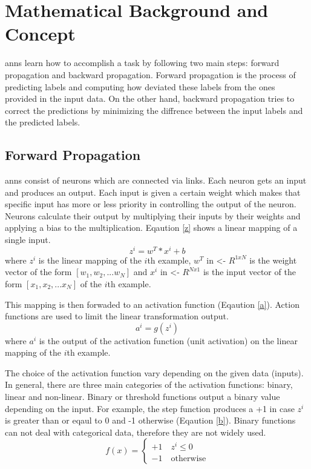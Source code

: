\documentclass[runningheads]{llncs}
\begin{document}
\section{Mathematical Background and Concept}
\gls{anns} learn how to accomplish a task by following two main steps:
forward propagation and backward propagation. Forward propagation is the process of
predicting labels and computing how deviated these labels from the ones provided in the input data.
On the other hand, backward propagation tries to correct the predictions by minimizing
the diffrence between the input labels and the predicted labels. 
\subsection{Forward Propagation}
\gls{anns} consist of neurons which are connected via links. Each neuron gets an input and produces an output. 
Each input is given a certain weight which makes that specific input has more or less priority in controlling the output of the neuron.
Neurons calculate their output by multiplying their inputs by their weights and applying a bias to the multiplication. Eqaution \ref{z}
shows a linear mapping of a single input.
\begin{equation}
\label{z}
    z^i = w^T * x^i + b
\end{equation}
where $z^i$ is the linear mapping of the $i$th example,  $w^T$ in <- $ R^{1xN} $ is the weight vector of the form $[w_1, w_2, ... w_N]$ and
$x^i$ in <- $ R^{Nx1} $ is the input vector  of the form $[x_1, x_2, ... x_N]$ of the $i$th example.

This mapping is then forwaded to an activation function (Eqaution \ref{a}).
Action functions are used to limit the linear transformation output.
\begin{equation}
    \label{a}
        a^i = g(z^i)
\end{equation}
where $a^i$ is the output of the activation function (unit activation) on the linear mapping of the $i$th example.

The choice of the activation function vary depending on the given data (inputs). 
In general, 
there are three main categories of the activation functions: binary, linear and non-linear. 
Binary or threshold functions output a binary value depending on the input. 
For example, the step function produces a +1 in case $z^i$ is greater than or eqaul to 0 and -1 otherwise (Eqaution \ref{b}).
Binary functions can not deal with categorical data, therefore they are not widely used.
\begin{equation}
    \label{b}
f(x) = \left\{ \begin{array}{ll} +1 \quad z^i \leq 0 \\ -1 \quad \text{otherwise} \end{array} \right.
\end{equation}
\end{document}
